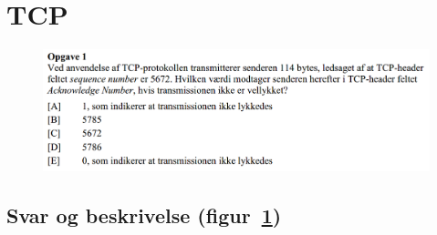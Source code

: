 \section{TCP}

\begin{figure}[H]
	\centering
	\includegraphics[width=\linewidth]{figs/sommer15/SE15OP1}
	\caption{}
	\label{fig:SE15OP1}
\end{figure}

\subsection{Svar og beskrivelse (figur~\ref{fig:SE15OP1})}
\derp

